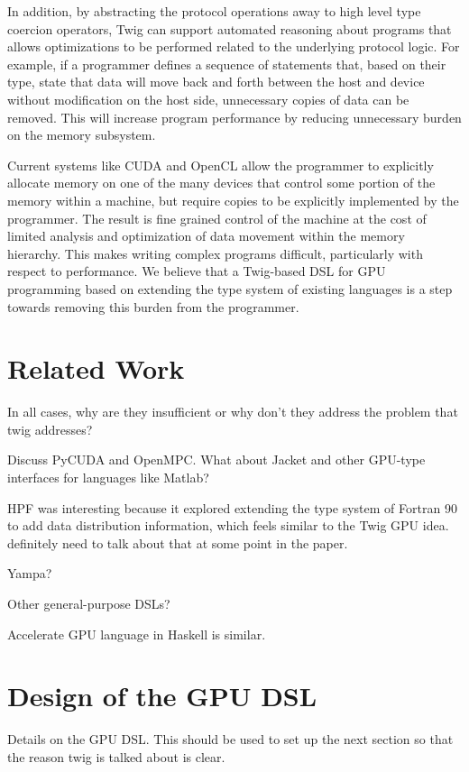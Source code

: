 \documentclass[11pt]{article}
\begin{document}
In addition, by abstracting the protocol operations away to high level type
coercion operators, Twig can support automated reasoning about programs that
allows optimizations to be performed related to the underlying protocol logic.
For example, if a programmer defines a sequence of statements that, based on
their type, state that data will move back and forth between the host and
device without modification on the host side, unnecessary copies of data can
be removed. This will increase program performance by reducing unnecessary
burden on the memory subsystem.

Current systems like CUDA and OpenCL allow the programmer to explicitly
allocate memory on one of the many devices that control some portion of the
memory within a machine, but require copies to be explicitly implemented by
the programmer. The result is fine grained control of the machine at the cost
of limited analysis and optimization of data movement within the memory
hierarchy. This makes writing complex programs difficult, particularly with
respect to performance. We believe that a Twig-based DSL for GPU programming
based on extending the type system of existing languages is a step towards
removing this burden from the programmer.

\section{Related Work}

In all cases, why are they insufficient or why don't they address the problem
that twig addresses?

Discuss PyCUDA and OpenMPC. What about Jacket and other GPU-type interfaces
for languages like Matlab?

HPF was interesting because it explored extending the type system of Fortran
90 to add data distribution information, which feels similar to the Twig GPU
idea. definitely need to talk about that at some point in the paper.

Yampa?

Other general-purpose DSLs?

Accelerate GPU language in Haskell is similar.  

\section{Design of the GPU DSL}

Details on the GPU DSL.  This should be used to set up the next section so
that the reason twig is talked about is clear.
\end{document}
